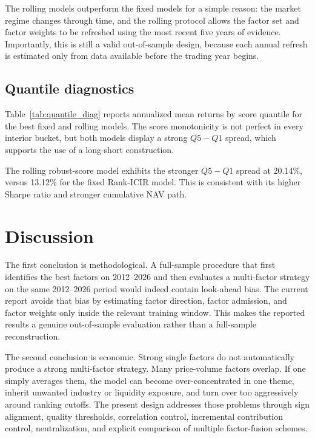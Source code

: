 \documentclass[11pt]{article}
\begin{document}
The rolling models outperform the fixed models for a simple reason: the market regime changes through time, and the rolling protocol allows the factor set and factor weights to be refreshed using the most recent five years of evidence. Importantly, this is still a valid out-of-sample design, because each annual refresh is estimated only from data available before the trading year begins.

\subsection{Quantile diagnostics}

Table~\ref{tab:quantile_diag} reports annualized mean returns by score quantile for the best fixed and rolling models. The score monotonicity is not perfect in every interior bucket, but both models display a strong \(Q5-Q1\) spread, which supports the use of a long-short construction.

\begin{table}[H]
\centering
\caption{Average annualized quantile returns for the best fixed and rolling models}
\label{tab:quantile_diag}
\resizebox{\textwidth}{!}{}
\end{table}

The rolling robust-score model exhibits the stronger \(Q5-Q1\) spread at 20.14\%, versus 13.12\% for the fixed Rank-ICIR model. This is consistent with its higher Sharpe ratio and stronger cumulative NAV path.

\section{Discussion}

The first conclusion is methodological. A full-sample procedure that first identifies the best factors on 2012--2026 and then evaluates a multi-factor strategy on the same 2012--2026 period would indeed contain look-ahead bias. The current report avoids that bias by estimating factor direction, factor admission, and factor weights only inside the relevant training window. This makes the reported results a genuine out-of-sample evaluation rather than a full-sample reconstruction.

The second conclusion is economic. Strong single factors do not automatically produce a strong multi-factor strategy. Many price-volume factors overlap. If one simply averages them, the model can become over-concentrated in one theme, inherit unwanted industry or liquidity exposure, and turn over too aggressively around ranking cutoffs. The present design addresses those problems through sign alignment, quality thresholds, correlation control, incremental contribution control, neutralization, and explicit comparison of multiple factor-fusion schemes.
\end{document}
